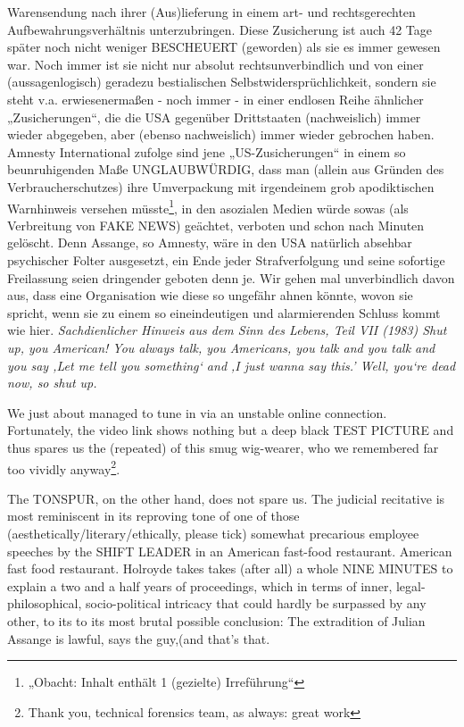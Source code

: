 \begin{multicols}{2}
{ Warensendung nach ihrer (Aus)lieferung in einem art- und rechtsgerechten
 Aufbewahrungsverhältnis unterzubringen.\textCR
Diese Zusicherung ist auch 42 Tage später noch nicht weniger BESCHEUERT
(geworden) als sie es immer gewesen war. Noch immer ist sie nicht nur absolut
rechtsunverbindlich und von einer (aussagenlogisch) geradezu bestialischen
Selbstwidersprüchlichkeit, sondern sie steht v.a. erwiesenermaßen - noch
immer - in einer endlosen Reihe ähnlicher „Zusicherungen“, die die USA
gegenüber Drittstaaten (nachweislich) immer wieder abgegeben, aber
(ebenso nachweislich) immer wieder gebrochen haben.\textCR
Amnesty International zufolge sind jene „US-Zusicherungen“ in einem so
beunruhigenden Maße UNGLAUBWÜRDIG, dass man (allein aus Gründen des
Verbraucherschutzes) ihre Umverpackung mit irgendeinem grob apodiktischen
Warnhinweis versehen müsste\footnote[31]{„Obacht: Inhalt enthält 1
(gezielte) Irreführung“}, in den asozialen Medien würde sowas (als Verbreitung
von FAKE NEWS) geächtet, verboten und schon nach Minuten gelöscht. Denn
Assange, so Amnesty, wäre in den USA natürlich absehbar psychischer Folter
ausgesetzt, ein Ende jeder Strafverfolgung und seine sofortige Freilassung
seien dringender geboten denn je. Wir gehen mal unverbindlich davon aus, dass
eine Organisation wie diese so ungefähr ahnen könnte, wovon sie spricht, wenn
sie zu einem so eineindeutigen und alarmierenden Schluss kommt wie hier.\textCR
\textit{Sachdienlicher Hinweis aus dem Sinn des Lebens, Teil VII (1983) Shut up,
 you American! You always talk, you Americans, you talk and you talk and you
 say 
‚Let me tell you something‘ and ‚I just wanna say this.’ Well, you‘re dead now,
 so shut up.}}


We just about managed to tune in via an unstable online connection. Fortunately, the video link
shows nothing but a deep black TEST PICTURE and thus spares us the (repeated) of this smug
wig-wearer, who we remembered far too vividly anyway\footnote[28]{Thank you, technical forensics
team, as always: great work}.

The TONSPUR, on the other hand, does not spare us. The judicial recitative is most reminiscent in
its reproving tone of one of those (aesthetically/literary/ethically, please tick) somewhat
precarious employee speeches by the SHIFT LEADER in an American fast-food restaurant. American fast
food restaurant. Holroyde takes takes (after all) a whole NINE MINUTES to explain a two and a half
years of proceedings, which in terms of inner, legal-philosophical, socio-political intricacy that
could hardly be surpassed by any other, to its to its most brutal possible conclusion: The
extradition of Julian Assange is lawful, says the guy,(and that's that.


\end{multicols}
